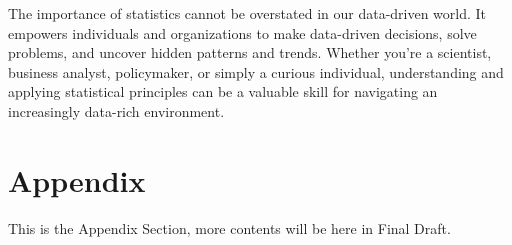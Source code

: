 \documentclass{article}
\begin{document}
The importance of statistics cannot be overstated in our data-driven world. It empowers individuals and organizations to make data-driven decisions, solve problems, and uncover hidden patterns and trends. Whether you're a scientist, business analyst, policymaker, or simply a curious individual, understanding and applying statistical principles can be a valuable skill for navigating an increasingly data-rich environment.\citep{einstein1905}


\section*{Appendix}
This is the Appendix Section, more contents will be here in Final Draft.



\cite{knuth1984}
\cite{einstein1905}
\end{document}
